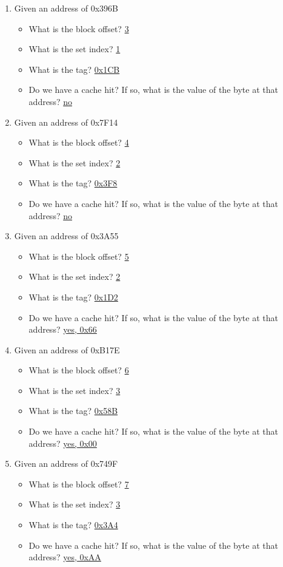 \documentclass{article}
\begin{document}
\begin{enumerate}
\item Given an address of 0x396B
    \begin{itemize}
    \item What is the block offset? \underline{3}
    \item What is the set index? \underline{1}
    \item What is the tag? \underline{0x1CB}
    \item Do we have a cache hit? If so, what is the value of the byte at that address? \underline{no}
    \end{itemize}

\item Given an address of 0x7F14
    \begin{itemize}
    \item What is the block offset? \underline{4}
    \item What is the set index? \underline{2}
    \item What is the tag? \underline{0x3F8}
    \item Do we have a cache hit? If so, what is the value of the byte at that address? \underline{no}
    \end{itemize}

\item Given an address of 0x3A55
    \begin{itemize}
    \item What is the block offset? \underline{5}
    \item What is the set index? \underline{2}
    \item What is the tag? \underline{0x1D2}
    \item Do we have a cache hit? If so, what is the value of the byte at that address? \underline{yes, 0x66}
    \end{itemize}

\item Given an address of 0xB17E
    \begin{itemize}
    \item What is the block offset? \underline{6}
    \item What is the set index? \underline{3}
    \item What is the tag? \underline{0x58B}
    \item Do we have a cache hit? If so, what is the value of the byte at that address? \underline{yes, 0x00}
    \end{itemize}

\item Given an address of 0x749F
    \begin{itemize}
    \item What is the block offset? \underline{7}
    \item What is the set index? \underline{3}
    \item What is the tag? \underline{0x3A4}
    \item Do we have a cache hit? If so, what is the value of the byte at that address? \underline{yes, 0xAA}
    \end{itemize}

\end{enumerate}
\end{document}
